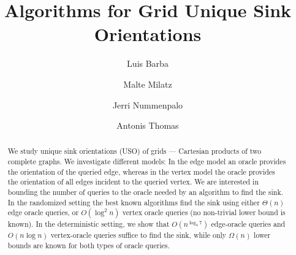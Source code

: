 \documentclass[runningheads,a4paper]{llncs}
\begin{document}
\mainmatter  %

\title{Algorithms for Grid Unique Sink Orientations}


%
%
\author{Luis Barba \and Malte Milatz \and Jerri Nummenpalo \and Antonis Thomas}%

%


%
%

\maketitle

\begin{abstract}
\noindent
 We study unique sink orientations (USO) of grids --- Cartesian products of two complete graphs.
 We investigate different models: In the edge model an oracle provides the orientation of the queried edge, whereas in the vertex model the oracle provides the orientation of all edges incident to the queried vertex. We are interested in bounding the number of queries to the oracle needed by an algorithm to find the sink.
In the randomized setting the best known algorithms find the sink using either $\Theta(n)$ edge oracle queries, or $O(\log^2 n)$ vertex oracle queries (no non-trivial lower bound is known). In the deterministic setting, we show that $O(n^{\log_4 7})$ edge-oracle queries and $O(n \log n)$ vertex-oracle queries suffice to find the sink, while only $\Omega(n)$ lower bounds are known for both types of oracle queries.
\end{abstract}
\end{document}
